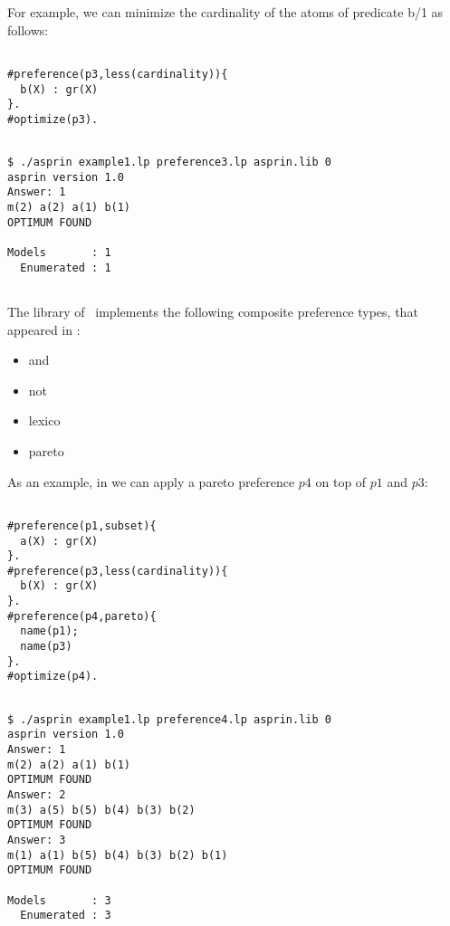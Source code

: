 
For example, we can minimize the cardinality of the atoms of predicate b/1 as follows: 
\begin{verbatim}

#preference(p3,less(cardinality)){                                                                                             
  b(X) : gr(X)                                                                                                    
}.
#optimize(p3).
\end{verbatim}
\begin{verbatim}

$ ./asprin example1.lp preference3.lp asprin.lib 0
asprin version 1.0
Answer: 1
m(2) a(2) a(1) b(1)
OPTIMUM FOUND

Models       : 1
  Enumerated : 1
  
\end{verbatim}

The library of  \asprin\ implements the following composite preference types,  
that appeared in \cite{sonpon06a}:
\begin{itemize}
	\item  and   
	\item  not    
	\item  lexico   
	\item  pareto  
\end{itemize}

%

As an example, in  we can apply a pareto preference $p4$ on top of $p1$ and $p3$: 
\begin{verbatim}

#preference(p1,subset){                                                                                             
  a(X) : gr(X)                                                                                                    
}.
#preference(p3,less(cardinality)){                                                                                             
  b(X) : gr(X)                                                                                                    
}.
#preference(p4,pareto){
  name(p1);
  name(p3)
}.
#optimize(p4).
\end{verbatim}
\begin{verbatim}

$ ./asprin example1.lp preference4.lp asprin.lib 0
asprin version 1.0
Answer: 1
m(2) a(2) a(1) b(1)
OPTIMUM FOUND
Answer: 2
m(3) a(5) b(5) b(4) b(3) b(2)
OPTIMUM FOUND
Answer: 3
m(1) a(1) b(5) b(4) b(3) b(2) b(1)
OPTIMUM FOUND

Models       : 3
  Enumerated : 3

\end{verbatim}

